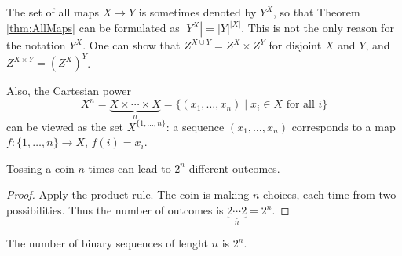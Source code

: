 \begin{page}
\setcounter{section}{2}
\setcounter{subsection}{2}
\setcounter{dfn}{4}
\label{portion:41}

\begin{rem}
The set of all maps $X \to Y$ is sometimes denoted by $Y^X$, so that Theorem \ref{thm:AllMaps} can be formulated as $\left|Y^X\right| = |Y|^{|X|}$.
This is not the only reason for the notation $Y^X$.
One can show that $Z^{X \cup Y} = Z^X \times Z^Y$ for disjoint $X$ and $Y$, and $Z^{X \times Y} = (Z^X)^Y$.

Also, the Cartesian power
\[
X^n = \underbrace{X \times \cdots \times X}_{n} = \{(x_1, \ldots, x_n) \mid x_i \in X \text{ for all }i\}
\]
can be viewed as the set $X^{\{1, \ldots, n\}}$:
a sequence $(x_1, \ldots, x_n)$ corresponds to a map $f \colon \{1, \ldots, n\} \to X$, $f(i) = x_i$.
\end{rem}

\end{page}

\begin{page}
\setcounter{section}{2}
\setcounter{subsection}{2}
\setcounter{dfn}{5}
\label{portion:44}

\begin{thm}
Tossing a coin $n$ times can lead to $2^n$ different outcomes.
\end{thm}

\end{page}

\begin{page}
\setcounter{section}{2}
\setcounter{subsection}{2}
\setcounter{dfn}{5}
\label{portion:45}

\begin{proof}
Apply the product rule.
The coin is making $n$ choices, each time from two possibilities.
Thus the number of outcomes is $\underbrace{2  \cdots  2}_n = 2^n$.
\end{proof}


\end{page}

\begin{page}
\setcounter{section}{2}
\setcounter{subsection}{2}
\setcounter{dfn}{6}
\label{portion:47}

\begin{thm}
The number of binary sequences of lenght $n$ is $2^n$.
\end{thm}

\end{page}

